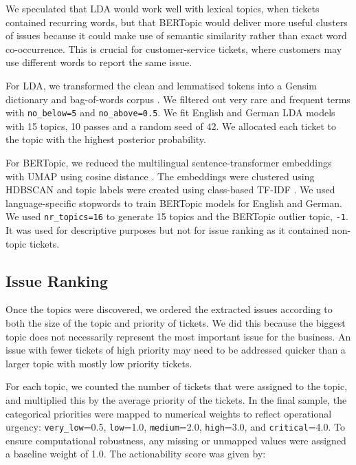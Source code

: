 \documentclass[11pt]{article}
\begin{document}
We speculated that LDA would work well with lexical topics, when tickets contained recurring words, but that BERTopic would deliver more useful clusters of issues because it could make use of semantic similarity rather than exact word co-occurrence. This is crucial for customer-service tickets, where customers may use different words to report the same issue.

For LDA, we transformed the clean and lemmatised tokens into a Gensim dictionary and bag-of-words corpus \citep{rehurek_lrec}. We filtered out very rare and frequent terms with \texttt{no\_below=5} and \texttt{no\_above=0.5}. We fit English and German LDA models with 15 topics, 10 passes and a random seed of 42. We allocated each ticket to the topic with the highest posterior probability.

For BERTopic, we reduced the multilingual sentence-transformer embeddings with UMAP using cosine distance \citep{mcinnes2018umap}. The embeddings were clustered using HDBSCAN and topic labels were created using class-based TF-IDF \citep{mcinnes2017hdbscan}. We used language-specific stopwords to train BERTopic models for English and German. We used \texttt{nr\_topics=16} to generate 15 topics and the BERTopic outlier topic, \texttt{-1}. It was used for descriptive purposes but not for issue ranking as it contained non-topic tickets.

\subsection{Issue Ranking}

Once the topics were discovered, we ordered the extracted issues according to both the size of the topic and priority of tickets. We did this because the biggest topic does not necessarily represent the most important issue for the business. An issue with fewer tickets of high priority may need to be addressed quicker than a larger topic with mostly low priority tickets.

For each topic, we counted the number of tickets that were assigned to the topic, and multiplied this by the average priority of the tickets. In the final sample, the categorical priorities were mapped to numerical weights to reflect operational urgency: \texttt{very\_low}=0.5, \texttt{low}=1.0, \texttt{medium}=2.0, \texttt{high}=3.0, and \texttt{critical}=4.0. To ensure computational robustness, any missing or unmapped values were assigned a baseline weight of 1.0. 
The actionability score was given by:
\end{document}
